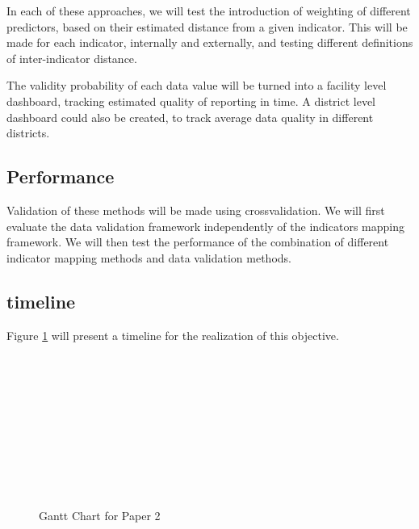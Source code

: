 In each of these approaches, we will test the introduction of weighting of different predictors, based on their estimated distance from a given indicator. This will be made for each indicator, internally and externally, and testing different definitions of inter-indicator distance.

The validity probability of each data value will be turned into a facility level dashboard, tracking estimated quality of reporting in time. A district level dashboard could also be created, to track average data quality in different districts.

\subsection{Performance}

Validation of these methods will be made using crossvalidation. We will first evaluate the data validation framework independently of the indicators mapping framework. We will then test the performance of the combination of different indicator mapping methods and data validation methods.

\subsection{timeline}

Figure \ref{Gantt2} will present a timeline for the realization of this objective.

\begin{figure}[h]
\begin{ganttchart}{1}{24}
 \\
 \\
 \\
 \\
 \\
 \\
 \\
 \\
 \\
\end{ganttchart}
\caption{Gantt Chart for Paper 2}
\label{Gantt2}
\end{figure}
